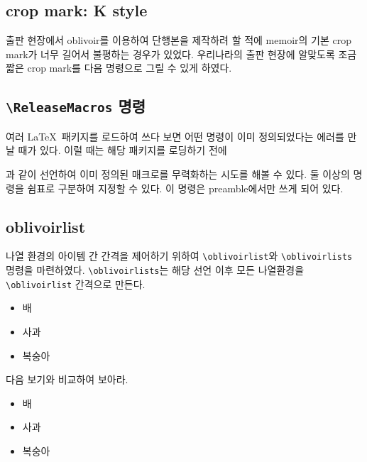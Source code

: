 \documentclass[
	12pt,
	a4paper,
	kosection,
	footnote,
	nobookmarks,
	microtype,
	figtabcapt,
]{oblivoir}
\def\cs#1{\texttt{\textbackslash #1}}
\begin{document}
\subsection{crop mark: K style}

출판 현장에서 oblivoir를 이용하여 단행본을 제작하려 할 적에 \textsf{memoir}의
기본 crop mark가 너무 길어서 불평하는 경우가 있었다. 우리나라의 출판 현장에
알맞도록 조금 짧은 crop mark를 다음 명령으로 그릴 수 있게 하였다.
\begin{boxedverbatim}
\trimKmark
\end{boxedverbatim}

\subsection{\cs{ReleaseMacros} 명령}

여러 \LaTeX\ 패키지를 로드하여 쓰다 보면 어떤 명령이 이미 정의되었다는 에러를
만날 때가 있다. 이럴 때는 해당 패키지를 로딩하기 전에
\begin{boxedverbatim}
\ReleaseMacros{\XeTeX,\XeLaTeX}
\end{boxedverbatim}
과 같이 선언하여 이미 정의된 매크로를 무력화하는 시도를 해볼 수 있다.
둘 이상의 명령을 쉼표로 구분하여 지정할 수 있다.
이 명령은 preamble에서만 쓰게 되어 있다.


\subsection{oblivoirlist}

나열 환경의 아이템 간 간격을 제어하기 위하여 \verb|\oblivoirlist|와 
\verb|\oblivoirlists| 명령을 마련하였다. \verb|\oblivoirlists|는
해당 선언 이후 모든 나열환경을 \verb|\oblivoirlist| 간격으로 만든다.

\begin{itemize}\oblivoirlist
\item 배
\item 사과
\item 복숭아
\end{itemize}

다음 보기와 비교하여 보아라.

\begin{itemize}
\item 배
\item 사과
\item 복숭아
\end{itemize}

\end{document}
